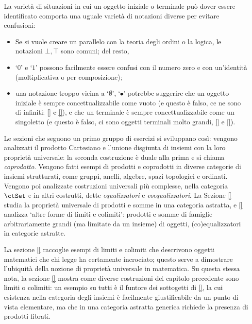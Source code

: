 \begin{remark}
	La varietà di situazioni in cui un oggetto iniziale o terminale può dover essere identificato comporta una uguale varietà di notazioni diverse per evitare confusioni:
	\begin{itemize}
		\item Se si vuole creare un parallelo con la teoria degli ordini o la logica, le notazioni \(\bot,\top\) sono comuni; del resto,
		\item `\(0\)' e `\(1\)' possono facilmente essere confusi con il numero zero e con un'identità (moltiplicativa o per composizione);
		\item una notazione troppo vicina a `\(\emptyset\)', `\(\bullet\)' potrebbe suggerire che un oggetto iniziale è sempre concettualizzabile come vuoto (e questo è falso, ce ne sono di infiniti: \ref{} e \ref{}), e che un terminale è sempre concettualizzabile come un singoletto (e questo è falso, ci sono oggetti terminali molto grandi, \ref{} e \ref{}).
	\end{itemize}
\end{remark}
Le sezioni che seguono un primo gruppo di esercizi si sviluppano così: vengono analizzati il prodotto Cartesiano e l'unione disgiunta di insiemi con la loro proprietà universale: la seconda costruzione è duale alla prima e si chiama \emph{coprodotto}. Vengono fatti esempi di prodotti e coprodotti in diverse categorie di insiemi strutturati, come gruppi, anelli, algebre, spazi topologici e ordinati. Vengono poi analizzate costruzioni universali più complesse, nella categoria \(\ctSet\) e in altri costrutti, dette \emph{equalizzatori} e \emph{coequalizzatori}. La Sezione \ref{} studia la proprietà universale di prodotti e somme in una categoria astratta, e \ref{} analizza `altre forme di limiti e colimiti': prodotti e somme di famiglie arbitrariamente grandi (ma limitate da un insieme) di oggetti, (co)equalizzatori in categorie astratte.

La sezione \ref{} raccoglie esempi di limiti e colimiti che descrivono oggetti matematici che chi legge ha certamente incrociato; questo serve a dimostrare l'ubiquità della nozione di proprietà universale in matematica. Su questa stessa nota, la sezione \ref{} mostra come diverse costruzioni del capitolo precedente sono limiti o colimiti: un esempio su tutti è il funtore dei sottogetti di \ref{}, la cui esistenza nella categoria degli insiemi è facilmente giustificabile da un punto di vista elementare, ma che in una categoria astratta generica richiede la presenza di prodotti fibrati.

